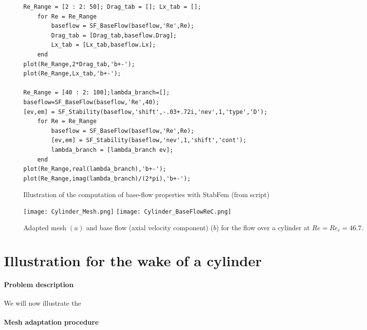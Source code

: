 \documentclass[twocolumn,10pt]{asme2ej}
\begin{document}
\begin{figure*}[t]
\small
\begin{lstlisting}
Re_Range = [2 : 2: 50]; Drag_tab = []; Lx_tab = [];
    for Re = Re_Range
        baseflow = SF_BaseFlow(baseflow,'Re',Re);
        Drag_tab = [Drag_tab,baseflow.Drag];
        Lx_tab = [Lx_tab,baseflow.Lx];
    end
plot(Re_Range,2*Drag_tab,'b+-');
plot(Re_Range,Lx_tab,'b+-');

Re_Range = [40 : 2: 100];lambda_branch=[];
baseflow=SF_BaseFlow(baseflow,'Re',40);
[ev,em] = SF_Stability(baseflow,'shift',-.03+.72i,'nev',1,'type','D');
    for Re = Re_Range
        baseflow = SF_BaseFlow(baseflow,'Re',Re);
        [ev,em] = SF_Stability(baseflow,'nev',1,'shift','cont');
        lambda_branch = [lambda_branch ev];
    end
plot(Re_Range,real(lambda_branch),'b+-');
plot(Re_Range,imag(lambda_branch)/(2*pi),'b+-');
\end{lstlisting}
\normalsize
\caption{Illustration of the computation of base-flow properties with StabFem (from script)}
\label{Listing2}
\end{figure*}


\begin{figure}
\texttt{[image: Cylinder\_Mesh.png]}
\texttt{[image: Cylinder\_BaseFlowReC.png]}
\caption{Adapted mesh $(a)$  and base flow (axial velocity component) ($b$) for the flow over a cylinder at $Re=Re_c = 46.7$.}
\label{fig:Baseflow}
\end{figure}



\section{Illustration for the wake of a cylinder} 
\vspace{.2cm}

\paragraph{Problem description}

We will now illustrate the 

\paragraph{Mesh adaptation procedure}
\end{document}
